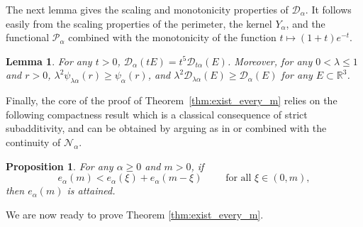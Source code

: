 \documentclass[a4paper,11pt,reqno]{amsart}
\numberwithin{equation}{section}
\newtheorem{proposition}[theorem]{Proposition}
\newtheorem{lemma}[theorem]{Lemma}
\theoremstyle{remark}
\theoremstyle{definition}
\newcommand{\R}{\mathbb R}
\newcommand{\nl}{\mathcal{N}_{\alpha}}
\renewcommand{\leq}{\leqslant}
\renewcommand{\geq}{\geqslant}
\newcommand{\calD}{\mathcal{D}}
\newcommand{\Pe}{\mathcal{P}}
\begin{document}
The next lemma gives the scaling and monotonicity properties of $\calD_\alpha$. It follows easily from the scaling properties of the perimeter, the kernel $Y_\alpha$, and the functional $\Pe_\alpha$ combined with the monotonicity of the function $t\mapsto (1+t)e^{-t}$.

	\begin{lemma}\label{lem:D_alpha_properties}
		For any $t>0$, $\calD_\alpha(tE) = t^5 \calD_{t\alpha}(E)$. Moreover, for any $0<\lambda\leq 1$ and $r>0$, $\lambda^2 \psi_{\lambda\alpha}(r) \geq \psi_\alpha(r)$, and $\lambda^2 \calD_{\lambda\alpha}(E) \geq \calD_\alpha(E)$ for any $E\subset \R^3$.
	\end{lemma}

	
Finally, the core of the proof of Theorem~\ref{thm:exist_every_m} relies on the following compactness result which is a classical consequence of strict subadditivity, and can be obtained by arguing as in \cite[Proposition 2.1, Lemma 2.2, Theorem 3.1]{FL} or \cite[Proposition 1.2, Lemma 3.4]{NP} combined with the continuity of $\nl$.

	\begin{proposition}\label{prop:compactness}
		For any $\alpha\geq 0$ and $m>0$, if
			\[
				e_\alpha(m) < e_\alpha(\xi) + e_\alpha(m-\xi) \qquad \text{ for all }\xi\in(0,m),
			\]
		then $e_\alpha(m)$ is attained.
	\end{proposition}
We are now ready to prove Theorem \ref{thm:exist_every_m}. 
  
\end{document}
